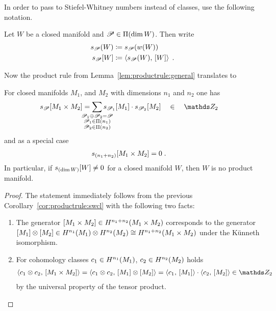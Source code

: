 In order to pass to Stiefel-Whitney numbers instead of classes, use
the following notation.
\begin{Def}
  Let $W$ be a closed manifold and $\mathscr{P}\in\Pi({\dim W})$.
  Then write
  \begin{align*}
    s_{\mathscr{P}}(W) &\coloneqq s_{\mathscr{P}}({w}(W))\\
    s_{\mathscr{P}}[W] &\coloneqq \left\langle s_{\mathscr{P}}(W),\, [W] \right\rangle
                      \;.
  \end{align*}
\end{Def}

Now the product rule from Lemma~\ref{lem:productrule:general} translates to
\begin{Cor}\label{cor:swnumdecompositionmfds}
  For closed manifolds $M_1$, and $M_2$ with dimensions $n_1$ and
  $n_2$ one has
  \begin{align*}
    \snum{\Part}{M_1\times M_2}
    &= \sum_{\mathclap{\substack{
      \Part_1\concat\Part_2=\Part\\
    \Part_1\in\PartitionsOf{n_1}\\
    \Part_2\in\PartitionsOf{n_2}\\
    }}}
    \snum{\Part_1}{M_1} \cdot \snum{\Part_2}{M_2}
    \quad \in \quad \Zmod2
  \end{align*}
  and as a special case
  \begin{align}
    \label{eq:productrule:swnum}
    s_{(n_1+n_2)}[M_1\times M_2] &= 0
                                      \;.
  \end{align}
  In particular, if $s_{(\dim W)}[W]\neq 0$ for a closed manifold
  $W$, then $W$ is no product manifold.
  \begin{proof}
    The statement immediately follows from the previous
    Corollary~\ref{cor:productrule:swcl} with the following
    two facts:
    \begin{enumerate}
    \item The generator $[M_1\times
        M_2]\in H^{n_1+n_2}(M_1\times M_2)$ corresponds to the generator
      $[M_1]\otimes[M_2]\in
      H^{n_1}(M_1)\otimes H^{n_2}(M_2)\cong H^{n_1+n_2}(M_1\times M_2)$
      under the Künneth isomorphism.
    \item For cohomology classes $c_1\in H^{n_1}(M_1)$, $c_2\in H^{n_2}(M_2)$ holds
      \begin{gather*}
        \capped{c_1\otimes c_2}{\fundcl{M_1\times M_2}}
        = \capped{c_1\otimes c_2}{\fundcl{M_1}\otimes\fundcl{M_2}}
        = \capped{c_1}{\fundcl{M_1}} \cdot \capped{c_2}{\fundcl{M_2}}
        \in \Zmod2
      \end{gather*}
      by the universal property of the tensor product.
      \qedhere
    \end{enumerate}    
  \end{proof}
\end{Cor}

